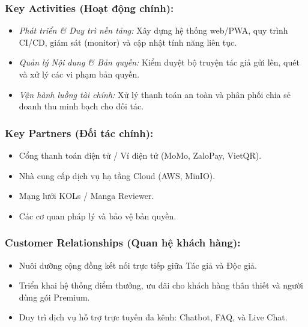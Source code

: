 \subsubsection{Key Activities (Hoạt động chính):}
\begin{itemize}
    \item \textit{Phát triển \& Duy trì nền tảng:} Xây dựng hệ thống web/PWA, quy trình CI/CD, giám sát (monitor) và cập nhật tính năng liên tục.
    \item \textit{Quản lý Nội dung \& Bản quyền:} Kiểm duyệt bộ truyện tác giả gửi lên, quét và xử lý các vi phạm bản quyền.
    \item \textit{Vận hành luồng tài chính:} Xử lý thanh toán an toàn và phân phối chia sẻ doanh thu minh bạch cho đối tác.
\end{itemize}

\subsubsection{Key Partners (Đối tác chính):}
\begin{itemize}
    \item Cổng thanh toán điện tử / Ví điện tử (MoMo, ZaloPay, VietQR).
    \item Nhà cung cấp dịch vụ hạ tầng Cloud (AWS, MinIO).
    \item Mạng lưới KOLs / Manga Reviewer.
    \item Các cơ quan pháp lý và bảo vệ bản quyền.
\end{itemize}

\subsubsection{Customer Relationships (Quan hệ khách hàng):}
\begin{itemize}
    \item Nuôi dưỡng cộng đồng kết nối trực tiếp giữa Tác giả và Độc giả.
    \item Triển khai hệ thống điểm thưởng, ưu đãi cho khách hàng thân thiết và người dùng gói Premium.
    \item Duy trì dịch vụ hỗ trợ trực tuyến đa kênh: Chatbot, FAQ, và Live Chat.
\end{itemize}

